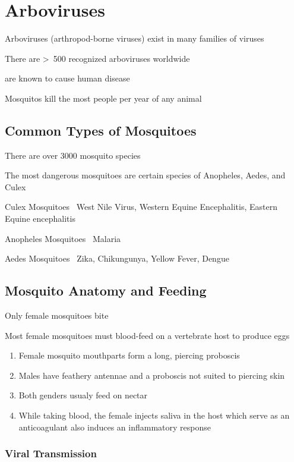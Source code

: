 \documentclass{notes}
\begin{document}
\section{Arboviruses}

Arboviruses (arthropod-borne viruses) exist in many families of viruses

There are \textgreater \ 500 recognized arboviruses worldwide

 are known to cause human disease

\tab Mosquitos kill the most people per year of any animal

\subsection{Common Types of Mosquitoes}

There are over 3000 mosquito species

The most dangerous mosquitoes are certain species of Anopheles, Aedes, and Culex

Culex Mosquitoes \textemdash \ West Nile Virus, Western Equine Encephalitis, Eastern Equine encephalitis

Anopheles Mosquitoes \textemdash \ Malaria

Aedes Mosquitoes \textemdash \ Zika, Chikungunya, Yellow Fever, Dengue

\subsection{Mosquito Anatomy and Feeding}

Only female mosquitoes bite

\tab Most female mosquitoes must blood-feed on a vertebrate host to produce eggs

\begin{enumerate}
    \item Female mosquito mouthparts form a long, piercing proboscis
    \item Males have feathery antennae and a proboscis not suited to piercing skin
    \item Both genders usualy feed on nectar
    \item While taking blood, the female injects saliva in the host which serve as an anticoagulant
    \subitem also induces an inflammatory response
\end{enumerate}

\subsubsection{Viral Transmission}
\end{document}
